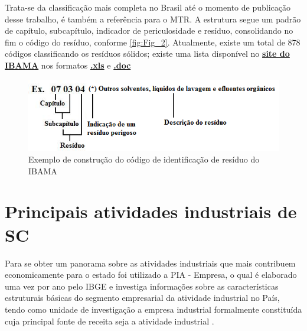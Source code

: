 Trata-se da classificação mais completa no Brasil até o momento de publicação desse trabalho, é também a referência para o \gls{MTR}. A estrutura segue um padrão de capítulo, subcapítulo, indicador de periculosidade e resíduo, consolidando no fim o código do resíduo, conforme \autoref{fig:Fig_2}. Atualmente, existe um total de 878 códigos classificando os resíduos sólidos; existe uma lista disponível no \href{https://www.gov.br/ibama/pt-br/assuntos/emissoes-e-residuos/residuos/arquivos?b_start:int=0}{\textbf{site do IBAMA}} nos formatos \href{https://www.gov.br/ibama/pt-br/assuntos/emissoes-e-residuos/residuos/arquivos/ibama-lista-brasileira-de-residuos-solidos.xls/view}{\textbf{.xls}} e \href{https://www.gov.br/ibama/pt-br/assuntos/emissoes-e-residuos/residuos/arquivos/ibama-lista-brasileira-de-residuos-solidos.doc/view}{\textbf{.doc}}

\begin{figure}[h]
	\caption{\label{fig:Fig_2} Exemplo de construção do código de identificação de resíduo do IBAMA}
	\begin{center}
		\includegraphics[scale=0.8]{images/exemplo-codigo-ibama.png}
	\end{center}
\end{figure}


\section{Principais atividades industriais de SC}

Para se obter um panorama sobre as atividades industriais que mais contribuem economicamente para o estado foi utilizado a \gls{PIA} - Empresa, o qual é elaborado uma vez por ano pelo \gls{IBGE} e investiga informações sobre as características estruturais básicas do segmento empresarial da atividade industrial no País, tendo como unidade de investigação a empresa industrial formalmente constituída cuja principal fonte de receita seja a atividade industrial \cite{ibge_pia-empresa_2021}. 

